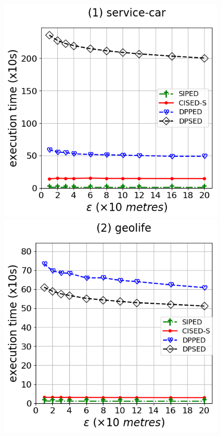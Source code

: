 {\begin{figure}[tb!]
\centering
\includegraphics[scale = 0.290]{Figures/Exp-time-epsilon-ped-service.png}\hspace{1ex}
\includegraphics[scale = 0.290]{Figures/Exp-time-epsilon-ped-geolife.png}\hspace{1ex}

\end{figure}}
